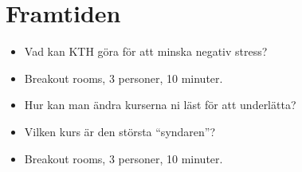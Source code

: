 \section{Framtiden}

\begin{frame}
  \begin{question}
    \begin{itemize}
      \item Vad kan KTH göra för att minska negativ stress?
    \end{itemize}
  \end{question}

  \begin{exercise}
    \begin{itemize}
      \item Breakout rooms, 3 personer, 10 minuter.
    \end{itemize}
  \end{exercise}
\end{frame}

\begin{frame}
  \begin{question}
    \begin{itemize}
      \item Hur kan man ändra kurserna ni läst för att underlätta?
      \item Vilken kurs är den största \enquote{syndaren}?
    \end{itemize}
  \end{question}

  \begin{exercise}
    \begin{itemize}
      \item Breakout rooms, 3 personer, 10 minuter.
    \end{itemize}
  \end{exercise}
\end{frame}

